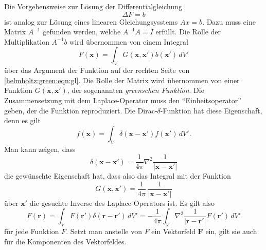 Die Vorgehensweise zur Lösung der Differentialgleichung
\begin{equation}
\Delta F = b
\label{helmholtz:green:eqn:gl}
\end{equation}
ist analog zur Lösung eines linearen Gleichungsysstems
$Ax=b$.
Dazu muss eine Matrix $A^{-1}$ gefunden werden, welche $A^{-1}A=I$
erfüllt.
Die Rolle der Multiplikation $A^{-1}b$ wird übernommen von einem
Integral
\[
F(\boldsymbol{x})
=
\int_V
G(\boldsymbol{x},\boldsymbol{x}')
b(\boldsymbol{x}')
\,dV'
\]
über das Argument der Funktion auf der rechten Seite von
\eqref{helmholtz:green:eqn:gl}.
Die Rolle der Matrix wird übernommen von einer Funktion
$G(\boldsymbol{x},\boldsymbol{x}')$, der sogenannten
\emph{greenschen Funktion}.
Die Zusammensetzung mit dem Laplace-Operator muss den ``Einheitsoperator''
geben, der die Funktion reproduziert.
Die Dirac-$\delta$-Funktion hat diese Eigenschaft, denn es gilt
\[
f(\boldsymbol{x})
=
\int_V
\delta(\boldsymbol{x}-\boldsymbol{x}')
f(\boldsymbol{x}')
\,dV'\!.
\]
Man kann zeigen, dass 
\[
\delta(\boldsymbol{x}-\boldsymbol{x}')
=
\frac{1}{4\pi} \nabla^2 \frac{1}{|\boldsymbol{x}-\boldsymbol{x}'|}
\]
die gewünschte Eigenschaft hat,
dass also das Integral mit der Funktion
\[
G(\boldsymbol{x},\boldsymbol{x}')
=
\frac{1}{4\pi}\,
\frac{1}{|\boldsymbol{x}-\boldsymbol{x}'|}
\]
über $\boldsymbol{x}'$ die gesuchte Inverse des Laplace-Operators ist.
%
%
%
Es gilt also
\[
F(\boldsymbol{r})
=
\int_V
F(\boldsymbol{r}')
\delta(\boldsymbol{r}-\boldsymbol{r}')
\,dV'
=
-\frac{1}{4\pi}
\int_V
\nabla^2 \frac{1}{|\boldsymbol{r}-\boldsymbol{r}'|}
F(\boldsymbol{r}')
\,dV'
\]
für jede Funktion $F$.
Setzt man anstelle von $F$ ein Vektorfeld $\boldsymbol{F}$ ein, gilt
sie auch für die Komponenten des Vektorfeldes.

